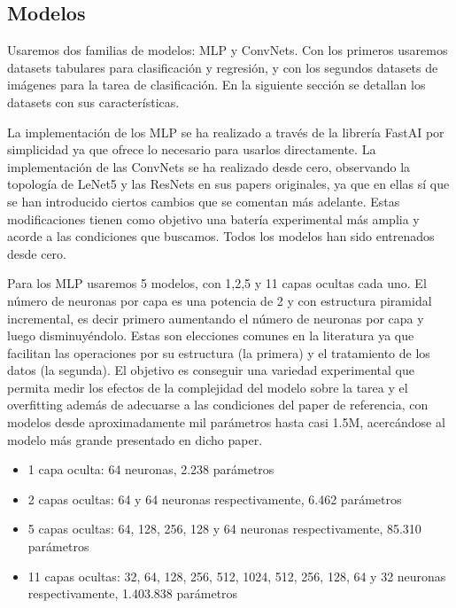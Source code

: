 \subsection{Modelos}

Usaremos dos familias de modelos: MLP y ConvNets. Con los primeros usaremos datasets tabulares para clasificación y regresión, y con los segundos datasets de imágenes para la tarea de clasificación. En la siguiente sección se detallan los datasets con sus características.

La implementación de los MLP se ha realizado a través de la librería FastAI por simplicidad ya que ofrece lo necesario para usarlos directamente. La implementación de las ConvNets se ha realizado desde cero, observando la topología de LeNet5 y las ResNets en sus papers originales, ya que en ellas sí que se han introducido ciertos cambios que se comentan más adelante. Estas modificaciones tienen como objetivo una batería experimental más amplia y acorde a las condiciones que buscamos. Todos los modelos han sido entrenados desde cero.

Para los MLP usaremos 5 modelos, con 1,2,5 y 11 capas ocultas cada uno. El número de neuronas por capa es una potencia de 2 y con estructura piramidal incremental, es decir primero aumentando el número de neuronas por capa y luego disminuyéndolo. Estas son elecciones comunes en la literatura ya que facilitan las operaciones por su estructura (la primera) y el tratamiento de los datos (la segunda). El objetivo es conseguir una variedad experimental que permita medir los efectos de la complejidad del modelo sobre la tarea y el overfitting además de adecuarse a las condiciones del paper de referencia, con modelos desde aproximadamente mil parámetros hasta casi 1.5M, acercándose al modelo más grande presentado en dicho paper. 
\begin{itemize}

	\item{1 capa oculta}: 64 neuronas, 2.238 parámetros

	\item{2 capas ocultas}: 64 y 64 neuronas respectivamente, 6.462 parámetros

	\item{5 capas ocultas}: 64, 128, 256, 128 y 64 neuronas respectivamente, 85.310 parámetros

	\item{11 capas ocultas}: 32, 64, 128, 256, 512, 1024, 512, 256, 128, 64 y 32 neuronas respectivamente, 1.403.838 parámetros

\end{itemize}

